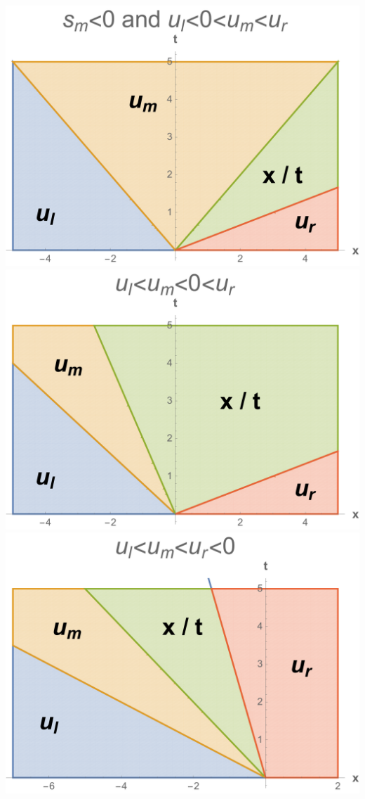 \documentclass[11pt, oneside]{article}
\begin{document}
\begin{enumerate}
\begin{center}
      \includegraphics[scale=.31]{Figures/01_04.pdf} \\
      \includegraphics[scale=.31]{Figures/01_05.pdf} \\
      \includegraphics[scale=.31]{Figures/01_06.pdf}
    \end{center}
    \pagebreak


\end{enumerate}
\end{document}
